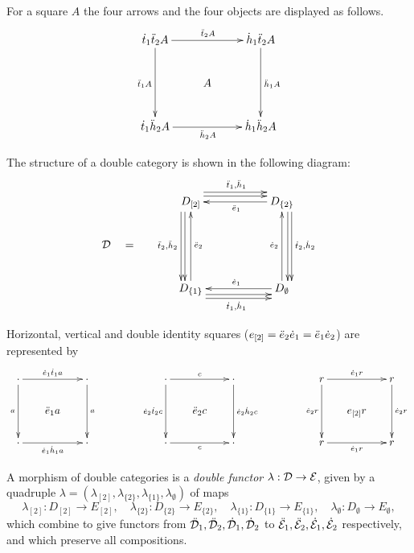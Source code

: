 For a square $A$ the four arrows and the four objects are displayed as follows.
$$
\xymatrix{
\dtto\ddttt A \ar[rr]^{\ddttt A} \ar[dd]_{\ddtto A} 
  &   & \dhho\ddttt A \ar[dd]^{\ddhho A} \\
  & A & \\
\dtto\ddhht A \ar[rr]_{\ddhht A} 
  &   & \dhho\ddhht A \\
}
$$

\medskip
The structure of a double category is shown in the following diagram: 
\begin{equation} \label{eq:dblcat}
\vcenter{\xymatrix @C=2pc @R=2pc{
 & D_{[2]} \ar[dd] <-1.2ex>  \ar[dd] <-2.0ex>_{\ddttt,\ddhht}
     \ar[rr] <+1.2ex>  \ar[rr] <+2.0ex>^{\ddtto,\ddhho}
    &&  D_{\{2\}}  \ar[ll]^{\ddeeo}
            \ar[dd]<+1.2ex>  \ar[dd] <+2.0ex>^{\dttt,\dhht}  \\
\calD \quad = \quad
 &  &&   \\
 & D_{\{1\}} \ar[uu]_{\ddeet}
     \ar[rr] <-1.2ex>  \ar[rr] <-2.0ex>_{\dtto,\dhho} 
    &&  D_{\emptyset} \ar[uu]^{\deet}   \ar[ll]_{\deeo} 
 \\
}} 
\end{equation}

Horizontal, vertical and double identity squares 
($e_{[2]} = \ddot{e}_2\dot{e}_1 = \ddot{e}_1\dot{e}_2$) are represented by 
$$
\xymatrix @C=1.5pc @R=1.5pc{
\cdot \ar[rr]^{\deeo\dtto a} \ar[dd]_{a}
  &  &  \cdot \ar[dd]^{a} \\
  &  \ddeeo a
     & \\
\cdot \ar[rr]_{\deeo \dhho a}
  &  &  \cdot
}
\qquad\qquad
\xymatrix @C=1.5pc @R=1.5pc{
\cdot \ar[dd]_{\deet\dttt c} \ar[rr]^{c}
  &  &  \cdot \ar[dd]^{\deet \dhht c} \\
  &  \ddeet c
     & \\
\cdot \ar[rr]_{c}
  &  &  \cdot
}
\qquad\qquad
\xymatrix @C=1.3pc @R=1.5pc{
r \ar[dd]_{\deet r} \ar[rr]^{\deeo r}
  &  &  r \ar[dd]^{\deet r} \\
  &  e_{[2]} r
     & \\
r \ar[rr]_{\deeo r}
  &  &  r
}
$$


\begin{defn}  
A morphism of double categories is a \emph{double functor}
$\lambda : \mathcal{D} \to \mathcal{E}$,  given by a quadruple 
$\lambda=(\lambda_{[2]},\lambda_{\{2\}},\lambda_{\{1\}},\lambda_{\emptyset})$ 
of maps 
$$
      \lambda_{[2]} : D_{[2]} \to E_{[2]},\quad
    \lambda_{\{2\}} : D_{\{2\}} \to E_{\{2\}},\quad
    \lambda_{\{1\}} : D_{\{1\}} \to E_{\{1\}},\quad
\lambda_{\emptyset} : D_{\emptyset} \to E_{\emptyset},
$$
which combine to give functors from 
$\ddot{\mathcal{D}}_1,\ddot{\mathcal{D}}_2,\dot{\mathcal{D}}_1,\dot{\mathcal{D}}_2$ to
$\ddot{\mathcal{E}}_1,\ddot{\mathcal{E}}_2,\dot{\mathcal{E}}_1,\dot{\mathcal{E}}_2$ respectively, 
and which preserve all compositions. 
\end{defn}

